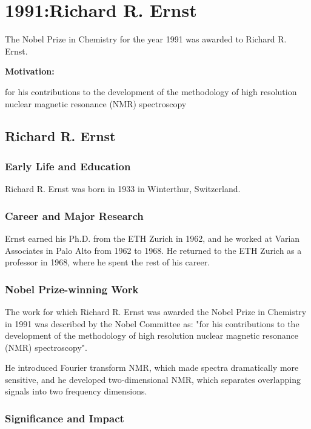 \chapter{1991:Richard R. Ernst}

\label{chap:chemistry1991}

The Nobel Prize in Chemistry for the year 1991 was awarded to Richard R. Ernst.

\textbf{Motivation:}

for his contributions to the development of the methodology of high resolution nuclear magnetic resonance (NMR) spectroscopy

\section{Richard R. Ernst}

\subsection*{Early Life and Education}

Richard R. Ernst was born in 1933 in Winterthur, Switzerland.

\subsection*{Career and Major Research}

Ernst earned his Ph.D. from the ETH Zurich in 1962, and he worked at Varian Associates in Palo Alto from 1962 to 1968. He returned to the ETH Zurich as a professor in 1968, where he spent the rest of his career.

\subsection*{Nobel Prize-winning Work}

The work for which Richard R. Ernst was awarded the Nobel Prize in Chemistry in 1991 was described by the Nobel Committee as: "for his contributions to the development of the methodology of high resolution nuclear magnetic resonance (NMR) spectroscopy".

He introduced Fourier transform NMR, which made spectra dramatically more sensitive, and he developed two-dimensional NMR, which separates overlapping signals into two frequency dimensions.

\subsection*{Significance and Impact}

